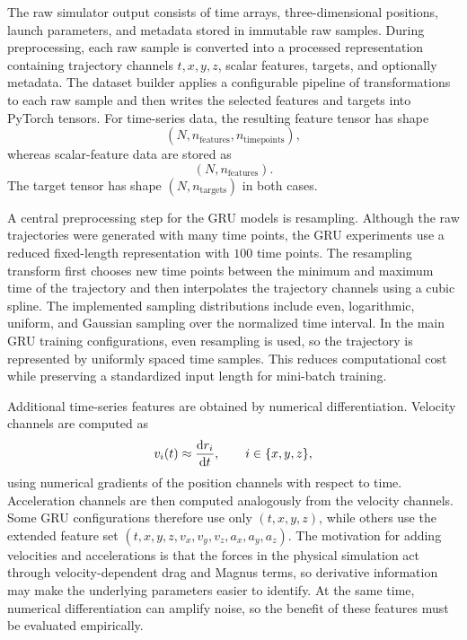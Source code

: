 The raw simulator output consists of time arrays, three-dimensional positions, launch parameters, and metadata stored in immutable raw samples.
During preprocessing, each raw sample is converted into a processed representation containing trajectory channels $t,x,y,z$, scalar features, targets, and optionally metadata.
The dataset builder applies a configurable pipeline of transformations to each raw sample and then writes the selected features and targets into PyTorch tensors.
For time-series data, the resulting feature tensor has shape
\begin{equation*}
    (N, n_{\mathrm{features}}, n_{\mathrm{timepoints}}),
\end{equation*}
whereas scalar-feature data are stored as
\begin{equation*}
    (N, n_{\mathrm{features}}).
\end{equation*}
The target tensor has shape $(N,n_{\mathrm{targets}})$ in both cases.

A central preprocessing step for the GRU models is resampling.
Although the raw trajectories were generated with many time points, the GRU experiments use a reduced fixed-length representation with $100$ time points.
The resampling transform first chooses new time points between the minimum and maximum time of the trajectory and then interpolates the trajectory channels using a cubic spline.\cite{de1978practical}
The implemented sampling distributions include even, logarithmic, uniform, and Gaussian sampling over the normalized time interval.
In the main GRU training configurations, even resampling is used, so the trajectory is represented by uniformly spaced time samples.
This reduces computational cost while preserving a standardized input length for mini-batch training.

Additional time-series features are obtained by numerical differentiation.
Velocity channels are computed as
\begin{equation*}
    v_i(t) \approx \dv{r_i}{t}, \qquad i\in\{x,y,z\},
\end{equation*}
using numerical gradients of the position channels with respect to time.
Acceleration channels are then computed analogously from the velocity channels.
Some GRU configurations therefore use only $(t,x,y,z)$, while others use the extended feature set $(t,x,y,z,v_x,v_y,v_z,a_x,a_y,a_z)$.
The motivation for adding velocities and accelerations is that the forces in the physical simulation act through velocity-dependent drag and Magnus terms, so derivative information may make the underlying parameters easier to identify.
At the same time, numerical differentiation can amplify noise, so the benefit of these features must be evaluated empirically. \cite{chartrand2011numerical}


